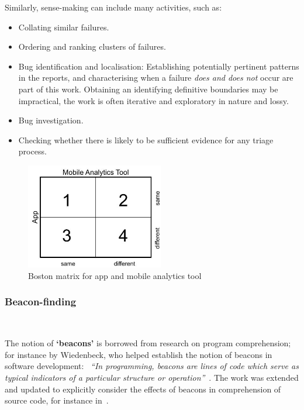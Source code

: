 Similarly, sense-making can include many activities, such as:
 \begin{itemize}
    \itemsep0em
    \item Collating similar failures.
    \item Ordering and ranking clusters of failures.
    \item Bug identification and localisation: Establishing potentially pertinent patterns in the reports, and characterising when a failure \emph{does and does not} occur are part of this work. Obtaining an identifying definitive boundaries may be impractical, the work is often iterative and exploratory in nature and lossy. 
    \item Bug investigation.
    \item Checking whether there is likely to be sufficient evidence for any triage process.
\end{itemize}

\begin{figure}
    \centering
    \includegraphics[width=6cm]{images/my/Boston-matrix-app-and-mobile-analytics-tool.jpeg}
    \caption{Boston matrix for app and mobile analytics tool}
    \label{fig:boston-matrix-app-and-mobile-analytics-tool}
\end{figure}

\subsubsection{Beacon-finding}~\label{section-beacon-finding-method}

The notion of \textbf{`beacons'} is borrowed from research on program comprehension; for instance by Wiedenbeck, who helped establish the notion of beacons in software development: ~\emph{``In programming, beacons are lines of code which serve as typical indicators of a particular structure or operation''}~. The work was extended and updated to explicitly consider the effects of beacons in comprehension of source code, for instance in~.

